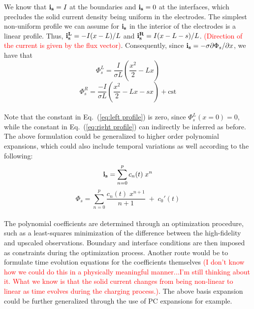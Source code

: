 We know that $\bold{i_s} = I$ at the boundaries and $\bold{i_s} = 0$ at the interfaces, which precludes the solid current density being uniform in the electrodes. The simplest non-uniform profile we can assume for $\bold{i_s}$ in the interior of the electrodes is a linear profile. Thus, $\bold{i_s^L} = -I(x-L)/L$ and $\bold{i_s^R} = I(x-L-s)/L$.
\textcolor{red}{(Direction of the current is given by the flux vector)}. 
Consequently, since $\bold{i_s} = -\sigma \partial \Phi_s / \partial x$, we have that 
\begin{equation}
\Phi_s^L = \frac{I}{\sigma L} \left(\frac{x^2}{2} - Lx \right)
\label{eq:left profile}
\end{equation}
\begin{equation}
\Phi_s^R = \frac{-I}{\sigma L} \left(\frac{x^2}{2} - Lx -sx \right) + \text{cst}
\label{eq:right profile}
\end{equation}
\\
Note that the constant in Eq.~(\ref{eq:left profile}) is zero, since $\Phi_s^L (x = 0) = 0$, while the constant in Eq.~(\ref{eq:right profile}) can indirectly be inferred as before. 
The above formulation could be generalized to higher order polynomial expansions, which could also include temporal variations as well according to the following:
\begin{equation}
\bold{i_s} = \sum_{n = 0}^{p} c_n (t) \; x^n
\end{equation}
 \begin{equation}
\Phi_s = \sum_{n = 0}^{p} {\frac{c_n (t) \; x^{n+1}}{n+1}} \; +\; {c_0}' (t)
\end{equation}
\\
The polynomial coefficients are determined through an optimization procedure, such as a least-squares minimization of the difference between the high-fidelity and upscaled observations.
Boundary and interface conditions are then imposed as constraints during the optimization process. 
Another route would be to formulate time evolution equations for the coefficients themselves \textcolor{red}{(I don't know how we could do this in a physically meaningful manner...I'm still thinking about it. What we know is that the solid current changes from being non-linear to linear as time evolves during the charging process.)}.    
The above basis expansion could be further generalized through the use of PC expansions for example. 

